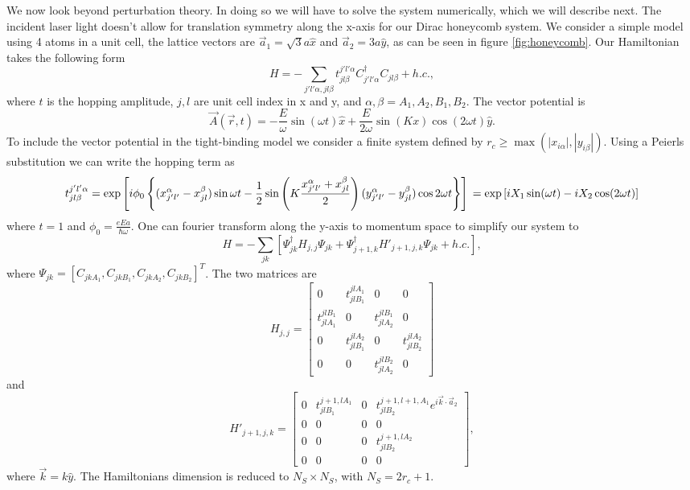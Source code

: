 We now look beyond perturbation theory.
In doing so we will have to solve the system numerically, which we will describe next.
The incident laser light doesn't allow for translation symmetry along the x-axis for our Dirac honeycomb system.
We consider a simple model using 4 atoms in a unit cell, the lattice vectors are $\vec{a}_1 = \sqrt{3}a\hat{x}$ and $\vec{a}_2 = 3a\hat{y}$, as can be seen in figure \ref{fig:honeycomb}.
Our Hamiltonian takes the following form
\begin{equation}
  H = -\sum_{j'l'\alpha,jl\beta} t^{j'l'\alpha}_{jl\beta} C^{\dagger}_{j'l'\alpha} C_{jl\beta} + h.c.,
\end{equation}
where $t$ is the hopping amplitude, $j,l$ are unit cell index in x and y, and $\alpha,\beta = A_1, A_2, B_1, B_2$.
The vector potential is
\begin{equation}
  \vec{A}(\vec{r},t) = -\dfrac{E}{\omega} \sin{(\omega t)} \hat{x} + \dfrac{E}{2\omega} \sin{(Kx)} \cos{(2\omega t)} \hat{y}.
\end{equation}
To include the vector potential in the tight-binding model we consider a finite system defined by $r_c \geq \max(|x_{i\alpha}|,|y_{i\beta}|)$.
Using a Peierls substitution we can write the hopping term as
\begin{dmath*}
t^{j'l'\alpha}_{jl\beta} = \exp\left[ i \phi_0 \left\{ (x_{j'l'}^{\alpha} - x_{jl}^{\beta}) \sin{\omega t} - \dfrac{1}{2} \sin\left(K \dfrac{x_{j'l'}^{\alpha} + x_{jl}^{\beta}}{2} \right) (y_{j'l'}^{\alpha} - y_{jl}^{\beta}) \cos{2\omega t}  \right\} \right] \\
  = \exp\left[ i X_1 \sin(\omega t) -i X_2 \cos(2\omega t)\right]
\end{dmath*}
where $t=1$ and $\phi_0 = \frac{e E a}{\hbar \omega}$.
One can fourier transform along the y-axis to momentum space to simplify our system to
\begin{equation}
  H = -\sum_{jk} \left[ \Psi^{\dagger}_{jk} H_{j,j} \Psi_{jk} + \Psi^{\dagger}_{j+1,k} H'_{j+1,j,k} \Psi_{jk} + h.c. \right],
\end{equation}
where $\Psi_{jk} = [C_{jkA_1}, C_{jkB_1}, C_{jkA_2}, C_{jkB_2}]^T$. The two matrices are
\[
  H_{j,j} =
  \begin{bmatrix}
    0 & t^{jlA_1}_{jlB_1} & 0 & 0 \\
    t^{jlB_1}_{jlA_1} & 0 & t^{jlB_1}_{jlA_2} & 0 \\
    0 & t^{jlA_2}_{jlB_1} & 0 & t^{jlA_2}_{jlB_2} \\
    0 & 0 & t^{jlB_2}_{jlA_2} & 0
  \end{bmatrix}
\]
and
\[
  H'_{j+1,j,k} =
  \begin{bmatrix}
    0 & t^{j+1,lA_1}_{jlB_1} & 0 & t^{j+1,l+1,A_1}_{jlB_2} e^{i\vec{k}\cdot\vec{a}_2} \\
    0 & 0 & 0 & 0 \\
    0 & 0 & 0 & t^{j+1,lA_2}_{jlB_2} \\
    0 & 0 & 0 & 0
  \end{bmatrix},
\]
where $\vec{k} = k \hat{y}$.
The Hamiltonians dimension is reduced to $N_S \times N_S$, with $N_S = 2r_c+1$.


